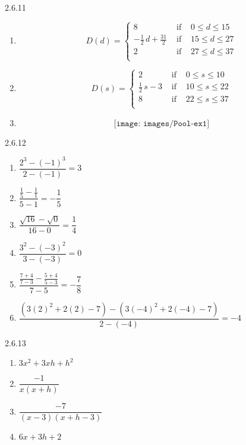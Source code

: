 \begin{Answer}{2.6.11}
	\begin{enumerate}

		\item \[{\displaystyle D(d) = \left\{ \begin{array}{rcl} 8 & \mbox{ if } & 0 \leq d \leq 15 \\
			-\frac{1}{2} \, d + \frac{31}{2} & \mbox{ if } & 15 \leq d \leq 27 \\
			2 & \mbox{ if } & 27 \leq d \leq 37  \\
			\end{array} \right. }\]

		\item \[{\displaystyle D(s) = \left\{ \begin{array}{rcl} 2 & \mbox{ if } & 0 \leq s \leq 10 \\
			\frac{1}{2} \, s -3 & \mbox{ if } & 10 \leq s \leq 22 \\
			8 & \mbox{ if } & 22 \leq s \leq 37  \\
			\end{array} \right. }\]

		\item $$\texttt{[image: images/Pool-ex1]}$$
\end{enumerate}

\end{Answer}
\begin{Answer}{2.6.12}

		\begin{enumerate}

			\item $\dfrac{2^{3} - (-1)^{3}}{2 - (-1)} = 3$
			\item $\dfrac{\frac{1}{5} - \frac{1}{1}}{5 - 1} = -\dfrac{1}{5}$
			\item $\dfrac{\sqrt{16} - \sqrt{0}}{16 - 0} = \dfrac{1}{4}$
			\item $\dfrac{3^{2} - (-3)^{2}}{3 - (-3)} = 0$
			\item $\dfrac{\frac{7 + 4}{7 - 3} - \frac{5 + 4}{5 - 3}}{7 - 5} = -\dfrac{7}{8}$
			\item \scriptsize $\dfrac{(3(2)^{2}+2(2)-7)-(3(-4)^{2}+2(-4)-7)}{2-(-4)}=-4$ \normalsize
		\end{enumerate}

\end{Answer}
\begin{Answer}{2.6.13}
	\begin{enumerate}

		\item $3x^{2} + 3xh + h^{2}$
		\item $\dfrac{-1}{x(x + h)}$
		\item $\dfrac{-7}{(x - 3)(x + h - 3)}$
		\item $6x + 3h + 2$
\end{enumerate}

\end{Answer}
